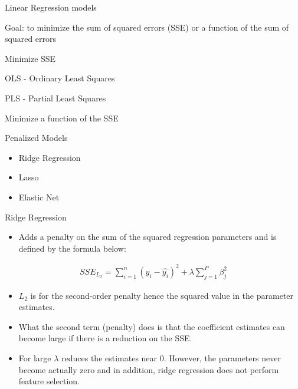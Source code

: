 \documentclass[ignorenonframetext,]{beamer}
\providecommand{\tightlist}{%
  \setlength{\itemsep}{0pt}\setlength{\parskip}{0pt}}
\begin{document}
\begin{frame}{Linear Regression models}

\begin{block}{Goal: to minimize the sum of squared errors (SSE) or a
function of the sum of squared errors}

\begin{block}{Minimize SSE}

OLS - Ordinary Least Squares

PLS - Partial Least Squares

\end{block}

\begin{block}{Minimize a function of the SSE}

Penalized Models

\begin{itemize}
\tightlist
\item
  Ridge Regression
\item
  Lasso
\item
  Elastic Net
\end{itemize}

\begin{block}{Ridge Regression}

\begin{itemize}
\tightlist
\item
  Adds a penalty on the sum of the squared regression parameters and is
  defined by the formula below:
\end{itemize}

\[
\begin{aligned}
SSE_{L_2} = \sum_{i=1}^n (y_i - \hat{y_i})^2 + \lambda \sum_{j=1}^P \beta_j^2
\end{aligned}
\]

\begin{itemize}
\item
  \(L_2\) is for the second-order penalty hence the squared value in the
  parameter estimates.
\item
  What the second term (penalty) does is that the coefficient estimates
  can become large if there is a reduction on the SSE.
\item
  For large \(\lambda\) reduces the estimates near 0. However, the
  parameters never become actually zero and in addition, ridge
  regression does not perform feature selection.
\end{itemize}

\end{block}


\end{block}
\end{block}
\end{frame}
\end{document}
